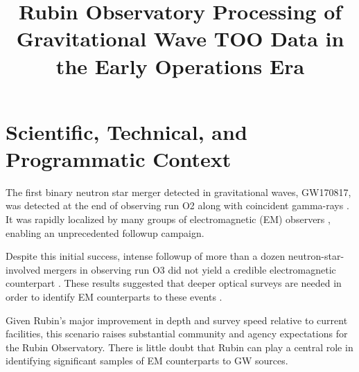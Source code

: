 \documentclass[DM,authoryear,toc]{lsstdoc}
\title{Rubin Observatory Processing of Gravitational Wave TOO Data in the Early Operations Era}
\date{\vcsDate}
\begin{document}


\maketitle

\section{Scientific, Technical, and Programmatic Context}

The first binary neutron star merger detected in gravitational waves, GW170817, was detected at the end of observing run O2 \citep{2017PhRvL.119p1101A} along with coincident gamma-rays \citep{2017ApJ...848L..13A}.
It was rapidly localized by many groups of electromagnetic (EM) observers \citep{2017ApJ...848L..12A}, enabling an unprecedented followup campaign.

Despite this initial success, intense followup of more than a dozen neutron-star-involved mergers in observing run O3 did not yield a credible electromagnetic counterpart \citep[e.g.,][]{2020ApJ...905..145K, 2022ApJ...927...50R, 2022MNRAS.509.3427D}.
These results suggested that deeper optical surveys are needed in order to identify EM counterparts to these events \citep[e.g.,][]{2020MNRAS.492..863C, 2021MNRAS.504.1294S}.

Given Rubin's major improvement in depth and survey speed relative to current facilities,
this scenario raises substantial community and agency expectations for the Rubin Observatory.
There is little doubt that Rubin can play a central role in identifying significant samples of EM counterparts to GW sources.
\end{document}
